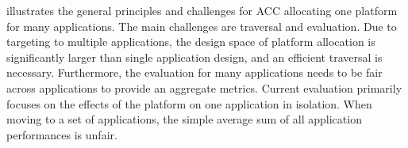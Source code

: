  illustrates the general principles and challenges for ACC allocating one platform for many applications. The main challenges are traversal and evaluation.  
Due to targeting to multiple applications, the design space of platform allocation is significantly larger than single application design, and an efficient traversal is necessary.
Furthermore, the evaluation for many applications needs to be fair across applications to provide an aggregate metrics. Current evaluation primarily focuses on the effects of the platform on one application in isolation. When moving to a set of applications, the simple average sum of all application performances is unfair.

\endgroup










